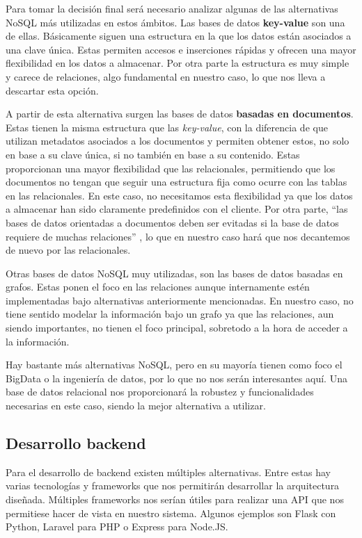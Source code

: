 Para tomar la decisión final será necesario analizar algunas de las alternativas NoSQL más utilizadas en estos ámbitos. Las bases de datos \textbf{key-value} son una de ellas. Básicamente siguen una estructura en la que los datos están asociados a una clave única. Estas permiten accesos e inserciones rápidas y ofrecen una mayor flexibilidad en los datos a almacenar. Por otra parte la estructura es muy simple y carece de relaciones, algo fundamental en nuestro caso, lo que nos lleva a descartar esta opción.

A partir de esta alternativa surgen las bases de datos \textbf{basadas en documentos}. Estas tienen la misma estructura que las \textit{key-value}, con la diferencia de que utilizan metadatos asociados a los documentos y permiten obtener estos, no solo en base a su clave única, si no también en base a su contenido. Estas proporcionan una mayor flexibilidad que las relacionales, permitiendo que los documentos no tengan que seguir una estructura fija como ocurre con las tablas en las relacionales. En este caso, no necesitamos esta flexibilidad ya que los datos a almacenar han sido claramente predefinidos con el cliente. Por otra parte, ``las bases de datos orientadas a documentos deben ser evitadas si la base de datos requiere de muchas relaciones'' \cite{NoSQLvsSQL_2}, lo que en nuestro caso hará que nos decantemos de nuevo por las relacionales.

Otras bases de datos NoSQL muy utilizadas, son las bases de datos basadas en grafos. Estas ponen el foco en las relaciones aunque internamente estén implementadas bajo alternativas anteriormente mencionadas. En nuestro caso, no tiene sentido modelar la información bajo un grafo ya que las relaciones, aun siendo importantes, no tienen el foco principal, sobretodo a la hora de acceder a la información.

Hay bastante más alternativas NoSQL, pero en su mayoría tienen como foco el BigData o la ingeniería de datos, por lo que no nos serán interesantes aquí. Una base de datos relacional nos proporcionará la robustez y funcionalidades necesarias en este caso, siendo la mejor alternativa a utilizar.

\subsection{Desarrollo backend}

Para el desarrollo de backend existen múltiples alternativas. Entre estas hay varias tecnologías y frameworks que nos permitirán desarrollar la arquitectura diseñada. Múltiples frameworks nos serían útiles para realizar una API que nos permitiese hacer de vista en nuestro sistema. Algunos ejemplos son Flask con Python, Laravel para PHP o Express para Node.JS. 

